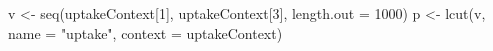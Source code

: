 \begin{Schunk}
% --begin: "pbld5"
\begin{Sinput}
v <- seq(uptakeContext[1], uptakeContext[3], length.out = 1000)
p <- lcut(v, name = "uptake", context = uptakeContext)
\end{Sinput}
%
% --end: "pbld5"
\end{Schunk}
